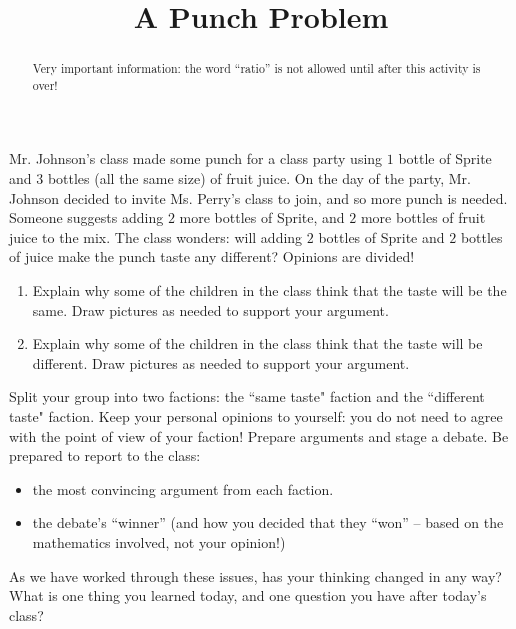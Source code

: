 \documentclass{ximera}
\title{A Punch Problem}
\begin{document}
\begin{abstract}
    Very important information: the word ``ratio'' is not allowed until after this activity is over!
\end{abstract}

\maketitle

Mr. Johnson's class made some punch for a class party using $1$ bottle of Sprite and $3$ bottles (all the same size) of fruit juice.  On the day of the party, Mr. Johnson decided to invite Ms. Perry's class to join, and so more punch is needed.  Someone suggests adding $2$ more bottles of Sprite, and $2$ more bottles of fruit juice to the mix.  The class wonders: will adding $2$ bottles of Sprite and $2$ bottles of juice make the punch taste any different?  Opinions are divided!

\begin{problem}
\begin{enumerate}
    \item Explain why some of the children in the class think that the taste will be the same.  Draw pictures as needed to support your argument.
    \item Explain why some of the children in the class think that the taste will be different.  Draw pictures as needed to support your argument.
\end{enumerate}
\end{problem}

\begin{problem}
Split your group into two factions: the ``same taste" faction and the ``different taste" faction.  Keep your personal opinions to yourself: you do not need to agree with the point of view of your faction!  Prepare arguments and stage a debate.  Be prepared to report to the class:
\begin{itemize}
    \item the most convincing argument from each faction.
    \item the debate's ``winner'' (and how you decided that they ``won'' -- based on the mathematics involved, not your opinion!)
\end{itemize}
\end{problem}

\begin{problem}
As we have worked through these issues, has your thinking changed in any way?  What is one thing you learned today, and one question you have after today's class?
\end{problem}
\end{document}
